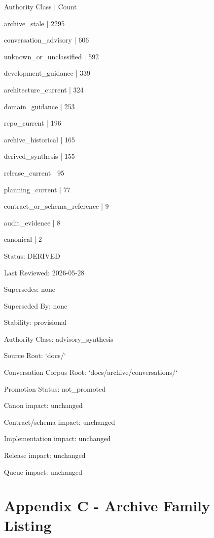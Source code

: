 \documentclass[11pt,a4paper]{report}
\begin{document}
{\small\ttfamily\raggedright Authority Class | Count\par}
{\small\ttfamily\raggedright archive\_stale | 2295\par}
{\small\ttfamily\raggedright conversation\_advisory | 606\par}
{\small\ttfamily\raggedright unknown\_or\_unclassified | 592\par}
{\small\ttfamily\raggedright development\_guidance | 339\par}
{\small\ttfamily\raggedright architecture\_current | 324\par}
{\small\ttfamily\raggedright domain\_guidance | 253\par}
{\small\ttfamily\raggedright repo\_current | 196\par}
{\small\ttfamily\raggedright archive\_historical | 165\par}
{\small\ttfamily\raggedright derived\_synthesis | 155\par}
{\small\ttfamily\raggedright release\_current | 95\par}
{\small\ttfamily\raggedright planning\_current | 77\par}
{\small\ttfamily\raggedright contract\_or\_schema\_reference | 9\par}
{\small\ttfamily\raggedright audit\_evidence | 8\par}
{\small\ttfamily\raggedright canonical | 2\par}


Status: DERIVED

Last Reviewed: 2026-\allowbreak{}05-\allowbreak{}28

Supersedes: none

Superseded By: none

Stability: provisional

Authority Class: advisory\_synthesis

Source Root: `docs/\allowbreak{}`

Conversation Corpus Root: `docs/\allowbreak{}archive/\allowbreak{}conversations/\allowbreak{}`

Promotion Status: not\_promoted

Canon impact: unchanged

Contract/\allowbreak{}schema impact: unchanged

Implementation impact: unchanged

Release impact: unchanged

Queue impact: unchanged


\chapter{Appendix C - Archive Family Listing}
\end{document}

